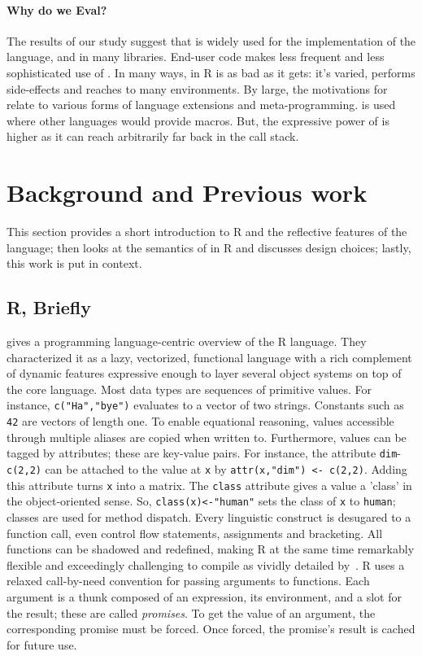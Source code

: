 \documentclass[screen,acmsmall]{acmart}%
\renewcommand{\k}[1]{\lstinline |#1|\xspace}
\begin{document}
\paragraph{Why do we Eval?} The results of our study suggest
that \eval is widely used for the implementation of the language, and in many
libraries. End-user code makes less frequent and less sophisticated use of
\eval. In many ways, \eval in R is as bad as it gets: it's varied, performs
side-effects and reaches to many environments. By large, the motivations for
\eval relate to various forms of language extensions and meta-programming. \Eval
is used where other languages would provide macros. But, the expressive power of
\eval is higher as it can reach arbitrarily far back in the call stack.


\section{Background and Previous work}

This section provides a short introduction to R and the reflective features of
the language; then looks at the semantics of \eval in R and discusses design
choices; lastly, this work is put in context.

\subsection{R, Briefly}

\citet{ecoop12} gives a programming language-centric overview of the R language.
They characterized it as a lazy, vectorized, functional language with a rich
complement of dynamic features expressive enough to layer several object systems
on top of the core language. Most data types are sequences of primitive values.
For instance, \k{c("Ha","bye")} evaluates to a vector of two strings. Constants
such as \k{42} are vectors of length one. To enable equational reasoning, values
accessible through multiple aliases are copied when written to. Furthermore,
values can be tagged by attributes; these are key-value pairs. For instance, the
attribute \k{dim}-\k{c(2,2)} can be attached to the value at \k{x} by
\k{attr(x,"dim") <- c(2,2)}. Adding this attribute turns \k{x} into a
matrix. The \k{class} attribute gives a value a 'class' in the object-oriented
sense. So, \k{class(x)<-"human"} sets the class of \k{x} to \k{human}; classes
are used for method dispatch. Every linguistic construct is desugared to a
function call, even control flow statements, assignments and bracketing. All
functions can be shadowed and redefined, making R at the same time remarkably
flexible and exceedingly challenging to compile as vividly detailed
by~\citet{dls19}. R uses a relaxed call-by-need convention for passing arguments
to functions. Each argument is a thunk composed of an expression, its
environment, and a slot for the result; these are called \emph{promises}. To get
the value of an argument, the corresponding promise must be forced. Once forced,
the promise's result is cached for future use.
\end{document}
